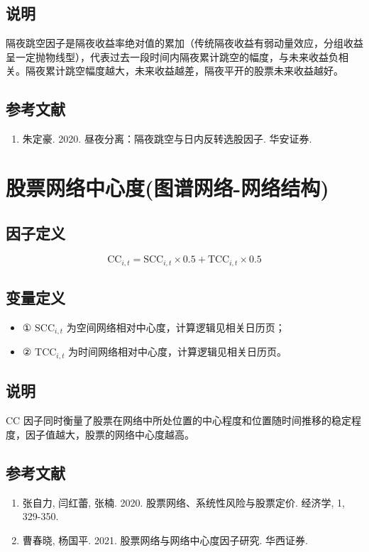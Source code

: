 \documentclass{article}
\begin{document}
\subsection{说明}
隔夜跳空因子是隔夜收益率绝对值的累加（传统隔夜收益有弱动量效应，分组收益呈一定抛物线型），代表过去一段时间内隔夜累计跳空的幅度，与未来收益负相关。隔夜累计跳空幅度越大，未来收益越差，隔夜平开的股票未来收益越好。

\subsection{参考文献}
\begin{enumerate}
    \item 朱定豪. 2020. 昼夜分离：隔夜跳空与日内反转选股因子. 华安证券.
\end{enumerate}

\section{股票网络中心度(图谱网络-网络结构)}

\subsection{因子定义}
\begin{equation}
    \mathrm{CC}_{i,t} = \mathrm{SCC}_{i,t} \times 0.5 + \mathrm{TCC}_{i,t} \times 0.5
\end{equation}

\subsection{变量定义}
\begin{itemize}
    \item ① \( \mathrm{SCC}_{i,t} \) 为空间网络相对中心度，计算逻辑见相关日历页；
    \item ② \( \mathrm{TCC}_{i,t} \) 为时间网络相对中心度，计算逻辑见相关日历页。
\end{itemize}

\subsection{说明}
\( \mathrm{CC} \) 因子同时衡量了股票在网络中所处位置的中心程度和位置随时间推移的稳定程度，因子值越大，股票的网络中心度越高。

\subsection{参考文献}
\begin{enumerate}
    \item 张自力, 闫红蕾, 张楠. 2020. 股票网络、系统性风险与股票定价. 经济学, 1, 329-350.
    \item 曹春晓, 杨国平. 2021. 股票网络与网络中心度因子研究. 华西证券.
\end{enumerate}
\end{document}
